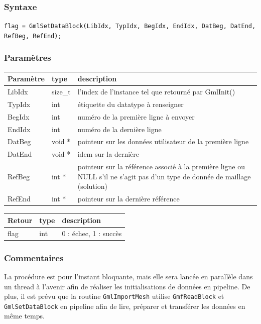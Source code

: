 \documentclass[a4paper,12pt]{article}
\begin{document}
\subsubsection*{Syntaxe}

{\tt flag = GmlSetDataBlock(LibIdx, TypIdx, BegIdx, EndIdx, DatBeg, DatEnd, RefBeg, RefEnd);}

\subsubsection*{Paramètres}

\begin{tabular}{|m{2cm}|m{1.5cm}|m{10.5cm}|}
\hline
Paramètre  & type    & description \\
\hline
LibIdx     & size\_t & l'index de l'instance tel que retourné par GmlInit() \\
\hline
TypIdx     & int     & étiquette du datatype à renseigner \\
\hline
BegIdx     & int     & numéro de la première ligne à envoyer \\
\hline
EndIdx     & int     & numéro de la dernière ligne  \\
\hline
DatBeg     & void *  & pointeur sur les données utilisateur de la première ligne \\
\hline
DatEnd     & void *  & idem sur la dernière \\
\hline
RefBeg     & int *   & pointeur sur la référence associé à la première ligne ou NULL s'il ne s'agit pas d'un type de donnée de maillage (solution) \\
\hline
RefEnd     & int *   & pointeur sur la dernière référence \\
\hline
\end{tabular}

\medskip

\begin{tabular}{|m{2cm}|m{1.5cm}|m{10.5cm}|}
\hline
Retour     & type   & description \\
\hline
flag       & int    & 0 : échec, 1 : succès \\
\hline
\end{tabular}

\subsubsection*{Commentaires}
La procédure est pour l'instant bloquante, mais elle sera lancée en parallèle dans un thread à l'avenir afin de réaliser les initialisations de données en pipeline.
De plus, il est prévu que la routine {\tt GmlImportMesh} utilise {\tt GmfReadBlock} et {\tt GmlSetDataBlock} en pipeline afin de lire, préparer et transférer les données en même temps.
\end{document}
